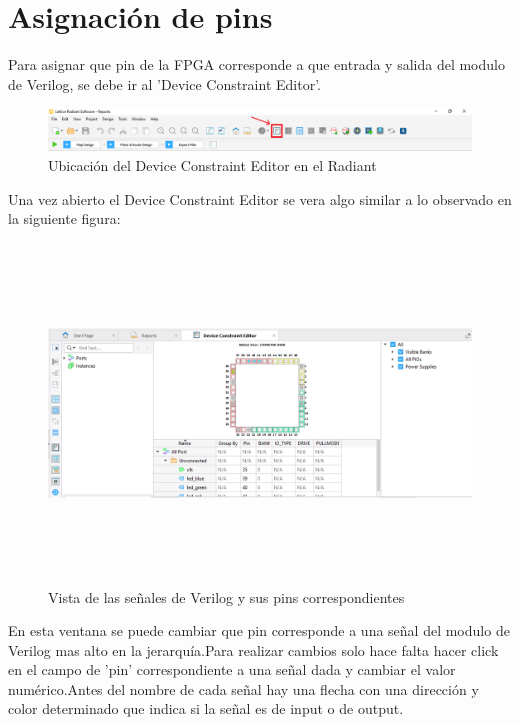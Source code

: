 \documentclass{article}
\begin{document}
\section{Asignación de pins}
Para asignar que pin de la FPGA corresponde a que entrada y salida del modulo de Verilog, se debe ir al 'Device Constraint Editor'.
	\begin{figure}[H]
	\centering
	\includegraphics[width=\textwidth]{Imagenes/pins.png}
	\caption{Ubicación del Device Constraint Editor en el Radiant}
	\end{figure}
	
 Una vez abierto el Device Constraint Editor se vera algo similar a lo observado en la siguiente figura:
 	\begin{figure}[H]
 	\centering
	\includegraphics[height=9cm,width=\textwidth]{Imagenes/DeviceConstraintEditor.png}
	\caption{Vista de las señales de Verilog y sus pins correspondientes}
	\end{figure}
 En esta ventana se puede cambiar que pin corresponde a una señal del modulo de Verilog mas alto en la jerarquía.Para realizar cambios solo hace falta hacer click en el campo de 'pin' correspondiente a una señal dada y cambiar el valor numérico.Antes del nombre de cada señal hay una flecha con una dirección y color determinado que indica si la señal es de input o de output.
 
\end{document}
